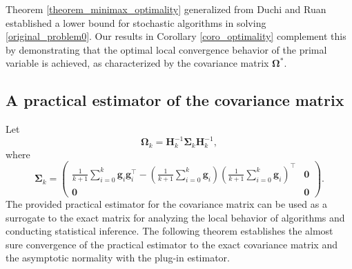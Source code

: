 \documentclass[aos]{imsart}
\numberwithin{equation}{section}
\theoremstyle{plain}
\begin{document}
Theorem \ref{theorem_minimax_optimality} generalized from Duchi and Ruan \cite[Theorem~1]{duchi2021asymptotic} established a lower bound for stochastic algorithms in solving \eqref{original_problem0}. Our results in Corollary \ref{coro_optimality} complement this by demonstrating that the optimal local convergence behavior of the primal variable is achieved, as characterized by the covariance matrix $\bm{\Omega}^{*}$.

\subsection{A practical estimator of the covariance matrix}

Let 
\begin{equation}
    \bm{\Omega}_{k} = \bm{H}_{k}^{-1} \bm{\Sigma}_{k} \bm{H}_{k}^{-1},
\end{equation}
where 
\begin{equation*}
    \bm{\Sigma}_{k} = \left( \begin{array}{cc}
        \frac{1}{k+1}\sum_{i=0}^{k} \bm{g}_i \bm{g}_i^{\top} - \left( \frac{1}{k+1}\sum_{i=0}^{k} \bm{g}_i\right)\left( \frac{1}{k+1}\sum_{i=0}^{k} \bm{g}_i\right)^{\top} &  \bm{0}\\
         \bm{0} & \bm{0}
    \end{array}\right).
\end{equation*}
The provided practical estimator for the covariance matrix can be used as a surrogate to the exact matrix for analyzing the local behavior of algorithms and conducting statistical inference. The following theorem establishes the almost sure convergence of the practical estimator to the exact covariance matrix and the asymptotic normality with the plug-in estimator.
\end{document}
